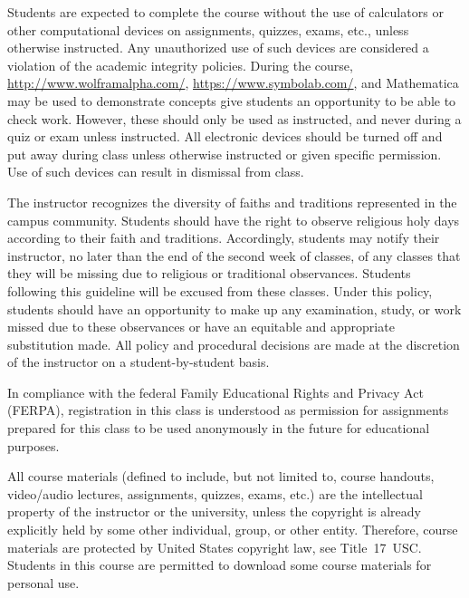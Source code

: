 \documentclass[11pt,letterpaper]{article}
\begin{document}
Students are expected to complete the course without the use of calculators or other computational devices on assignments, quizzes, exams, etc., unless otherwise instructed. Any unauthorized use of such devices are considered a violation of the academic integrity policies. During the course, \href{http://www.wolframalpha.com/}{http://www.wolframalpha.com/}, \href{https://www.symbolab.com/}{https://www.symbolab.com/}, and Mathematica may be used to demonstrate concepts give students an opportunity to be able to check work. However, these should only be used as instructed, and never during a quiz or exam unless instructed. All electronic devices should be turned off and put away during class unless otherwise instructed or given specific permission. Use of such devices can result in dismissal from class.
\sectionbreak




The instructor recognizes the diversity of faiths and traditions represented in the campus community. Students should have the right to observe religious holy days according to their faith and traditions. Accordingly, students may notify their instructor, no later than the end of the second week of classes, of any classes that they will be missing due to religious or traditional observances. Students following this guideline will be excused from these classes. Under this policy, students should have an opportunity to make up any examination, study, or work missed due to these observances or have an equitable and appropriate substitution made. All policy and procedural decisions are made at the discretion of the instructor on a student-by-student basis. 
\sectionbreak




In compliance with the federal Family Educational Rights and Privacy Act (FERPA), registration in this class is understood as permission for assignments prepared for this class to be used anonymously in the future for educational purposes.
\sectionbreak




All course materials (defined to include, but not limited to, course handouts, video/audio lectures, assignments, quizzes, exams, etc.) are the intellectual property of the instructor or the university, unless the copyright is already explicitly held by some other individual, group, or other entity. Therefore, course materials are protected by United States copyright law, see Title~17~USC. Students in this course are permitted to download some course materials for personal use. \pspace
\end{document}
